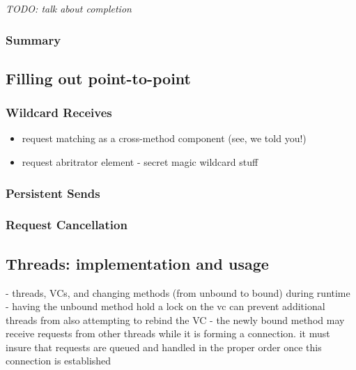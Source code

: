 \emph{TODO: talk about completion}

\subsubsection{Summary}



\subsection{Filling out point-to-point}

\subsubsection{Wildcard Receives}
\begin{itemize}
  \item request matching as a cross-method component (see, we told you!)
  \item request abritrator element - secret magic wildcard stuff
\end{itemize}

\subsubsection{Persistent Sends}

\subsubsection{Request Cancellation}


\subsection{Threads: implementation and usage}
- threads, VCs, and changing methods (from unbound to bound) during runtime
  - having the unbound method hold a lock on the vc can prevent additional
    threads from also attempting to rebind the VC
  - the newly bound method may receive requests from other threads while
    it is forming a connection.  it must insure that requests are queued
    and handled in the proper order once this connection is established

